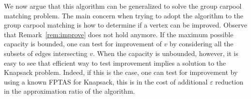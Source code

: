 We now argue that this algorithm can be generalized to solve the group carpool
matching problem.
The main concern when trying to adopt the algorithm to the group carpool
matching is how to determine if a vertex can be improved.
Observe that Remark~\ref{rem:improve} does not hold anymore.
If the maximum possible capacity is bounded, one can test for improvement of
$v$ by considering all the subsets of edges intersecting $v$. 
When the capacity is unbounded, however, it is easy to see that efficient
way to test improvement implies a solution to the Knapsack problem.
Indeed, if this is the case, one can test for improvement by using a known FPTAS
for Knapsack, this is in the cost of additional $\varepsilon$ reduction in the
approximation ratio of the algorithm.

